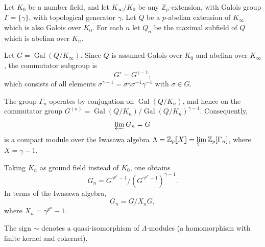 Let $K_0$ be a number field, and let $K_\infty/K_0$ be any $\mathbb{Z}_p$-extension, with Galois group $\Gamma = \{\gamma\}$, with topological generator $\gamma$. Let $Q$ be a $p$-abelian extension of $K_\infty$ which is also Galois over $K_0$. For each $n$ let $Q_n$ be the maximal subfield of $Q$ which is abelian over $K_n$.

Let $G = \operatorname{Gal}(Q/K_\infty)$. Since $Q$ is assumed Galois over $K_0$ and abelian over $K_\infty$, the commutator subgroup is
$$G' = G^{\gamma-1},$$
which consists of all elements $\sigma^{\gamma-1} = \sigma\gamma\sigma^{-1}\gamma^{-1}$ with $\sigma \in G$.

The group $\Gamma_n$ operates by conjugation on $\operatorname{Gal}(Q/K_n)$, and hence on the commutator group $G^{(n)} = \operatorname{Gal}(Q/K_n) / \operatorname{Gal}(Q/K_n)^{\gamma-1}$. Consequently,
$$\varprojlim G_n = G$$
is a compact module over the Iwasawa algebra $\Lambda = \mathbb{Z}_p[\![X]\!] = \varprojlim \mathbb{Z}_p[\Gamma_n]$, where $X = \gamma - 1$.

Taking $K_n$ as ground field instead of $K_0$, one obtains
$$G_n = G^{\gamma^{p^n}-1} / (G^{\gamma^{p^n}-1})^{\gamma-1}.$$
In terms of the Iwasawa algebra,
$$G_n = G / X_n G,$$
where $X_n = \gamma^{p^n} - 1$.

The sign $\sim$ denotes a quasi-isomorphism of $\Lambda$-modules (a homomorphism with finite kernel and cokernel).
